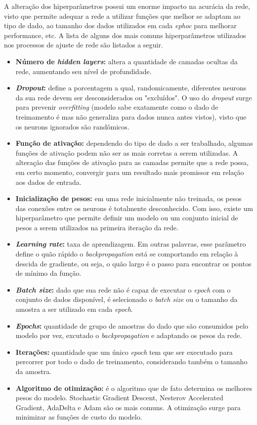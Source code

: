 A alteração dos hiperparâmetros possui um enorme impacto na acurácia da rede, visto que permite adequar a rede a utilizar funções que melhor se adaptam ao tipo de dado, ao tamanho dos dados utilizados em cada \textit{ephoc} para melhorar performance, etc. A lista de alguns dos mais comuns hiperparâmetros utilizados nos processos de ajuste de rede são listados a seguir.

\begin{itemize}
  \item \textbf{Número de \textit{hidden layers}:} altera a quantidade de camadas ocultas da rede, aumentando seu nível de profundidade.
  \item \textbf{\textit{Dropout}:} define a porcentagem a qual, randomicamente, diferentes neurons da sua rede devem ser desconsiderados ou "excluídos". O uso do \textit{dropout} surge para prevenir \textit{overfitting} (modelo sabe exatamente como o dado de treimamento é mas não generaliza para dados nunca antes vistos), visto que os neurons ignorados são randômicos.
  \item \textbf{Função de ativação:} dependendo do tipo de dado a ser trabalhado, algumas funções de ativação podem não ser as mais corretas a serem utilizadas. A alteração das funções de ativação para as camadas permite que a rede possa, em certo momento, convergir para um resultado mais promissor em relação aos dados de entrada.
  \item \textbf{Inicialização de pesos:} em uma rede inicialmente não treinada, os pesos das conexões entre os neurons é totalmente desconhecido. Com isso, existe um hiperparâmetro que permite definir um modelo ou um conjunto inicial de pesos a serem utilizados na primeira iteração da rede.
  \item \textbf{\textit{Learning rate}:} taxa de aprendizagem. Em outras palavras, esse parâmetro define o quão rápido o \textit{backpropagation} está se comportando em relação à descida de gradiente, ou seja, o quão largo é o passo para encontrar os pontos de mínimo da função.
  \item \textbf{\textit{Batch size}:} dado que sua rede não é capaz de executar o \textit{epoch} com o conjunto de dados disponível, é selecionado o \textit{batch size} ou o tamanho da amostra a ser utilizado em cada \textit{epoch}.
  \item \textbf{\textit{Epochs}:} quantidade de grupo de amostras do dado que são consumidos pelo modelo por vez, excutado o \textit{backpropagation} e adaptando os pesos da rede.
  \item \textbf{Iterações:} quantidade que um único \textit{epoch} tem que ser executado para percorrer por todo o dado de treinamento, considerando também o tamanho da amostra.
  \item \textbf{Algoritmo de otimização:} é o algoritmo que de fato determina os melhores pesos do modelo. Stochastic Gradient Descent, Nesterov Accelerated Gradient, AdaDelta e Adam são os mais comuns. A otimização surge para minimizar as funções de custo do modelo.
\end{itemize}

